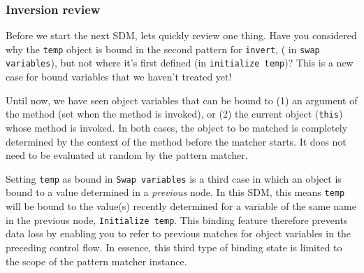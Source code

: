 \newpage
\subsubsection{Inversion review}
\genHeader
\hypertarget{invert close}{}

Before we start the next SDM, lets quickly review one thing. Have you considered why the \texttt{temp} object is bound in the second pattern for
\texttt{invert}, ( in \texttt{swap variables}), but not where it's first defined (in \texttt{initialize temp})? This is a new case for bound variables that we
haven't treated yet!

Until now, we have seen object variables that can be bound to (1) an argument of the method (set when the method is invoked), or (2) the
current object (\texttt{this}) whose method is invoked. In both cases, the object to be matched is completely determined by the context of the method before
the matcher starts. It does not need to be evaluated at random by the pattern matcher.

Setting \texttt{temp} as bound in \texttt{Swap variables} is a third case in which an object is bound to a value determined in a \emph{previous} node. In
this SDM, this means \texttt{temp} will be bound to the value(s) recently determined for a variable of the same name in the previous node, \texttt{Initialize
temp}. This binding feature therefore prevents data loss by enabling you to refer to previous matches for object variables in the preceding control flow. In
essence, this third type of binding state is limited to the scope of the pattern matcher instance.
